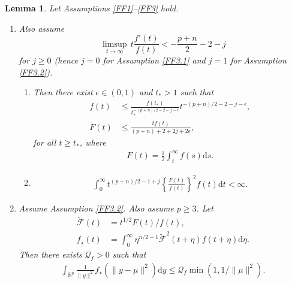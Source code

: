 \documentclass[preprint,11pt]{imsart}
\numberwithin{equation}{section}
\theoremstyle{plain}
\newtheorem{lemma}{Lemma}[section]
\theoremstyle{definition}
\theoremstyle{remark}
\newcommand{\rd}{\mathrm{d}}
\begin{document}
\begin{lemma}\label{lem:f}
 Let Assumptions \ref{FF1}--\ref{FF3} hold.
\begin{enumerate}
 \item\label{lem:f.1} Also assume
 \begin{equation}\label{eq:lem:f.1}
 \limsup_{t\to\infty}\, t\frac{f'(t)}{f(t)}<-\frac{p+n}{2}-2-j
 \end{equation}
      for $j\geq 0$ (hence $j=0$ for Assumption \ref{FF3.1} and $j=1$ for Assumption \ref{FF3.2}).
\begin{enumerate}[label= 1.\Alph*]
 \item\label{lem:f.1.1} Then there exist $\epsilon\in(0,1)$ and $t_*>1$ such that
\begin{equation}\label{fF.asymptotic}
 \begin{split}
 f(t)&\leq \frac{f(t_*)}{t_*^{-(p+n)/2-2-j-\epsilon}}t^{-(p+n)/2-2-j-\epsilon}, \\
F(t)&\leq \frac{tf(t)}{(p+n)+2+2j+2\epsilon},
\end{split}
\end{equation}
for all $t\geq t_*$,  where
 \begin{align*}
  F(t)=\frac{1}{2}\int_t^\infty f(s)\rd s.
 \end{align*}
\item \label{lem:f.1.2}
 \begin{align*}
  \int_0^\infty t^{(p+n)/2-1+j}\left\{\frac{F(t)}{f(t)}\right\}^2f(t) \rd t<\infty.
 \end{align*}
\end{enumerate}
\item\label{lem:f.2} Assume Assumption \ref{FF3.2}. Also assume $p\geq 3$. Let 
\begin{align*}
\tilde{\mathcal{F}}(t)&=t^{1/2}F(t)/f(t), \\
 f_\star(t)&=\int_0^\infty \eta^{n/2-1}\tilde{\mathcal{F}}^2(t+\eta)f(t+\eta)
 \rd \eta.
\end{align*}
      Then there exists $\mathcal{Q}_f>0$ such that
      \begin{align}
       \int_{\mathbb{R}^p}\frac{1}{\|y\|^2}f_\star(\|y-\mu\|^2)\rd y \leq \mathcal{Q}_f\min(1,1/\|\mu\|^{2}).
      \end{align}
\end{enumerate}
\end{lemma}
\end{document}
